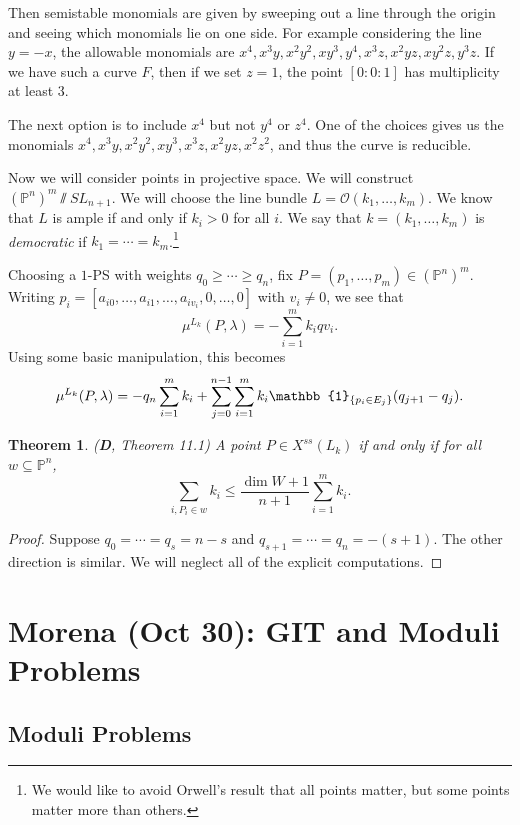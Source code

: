 \documentclass[leqno, openany]{memoir}
\newtheorem{thm}{Theorem}[section]
\theoremstyle{definition}
\theoremstyle{remark}
\theoremstyle{plain}
\theoremstyle{definition}
\theoremstyle{remark}
\renewcommand{\P}{\mathbb{P}}
\newcommand{\mc}[1]{\mathcal{#1}}
\begin{document}
Then semistable monomials are given by sweeping out a line through the origin
and seeing which monomials lie on one side. For example considering the line $y
= -x$, the allowable monomials are $x^4, x^3 y, x^2 y^2, xy^3, y^4, x^3z,
x^2yz, xy^2z,y^3z$. If we have such a curve $F$, then if we set $z=1$, the
point $[0:0:1]$ has multiplicity at least $3$.

The next option is to include $x^4$ but not $y^4$ or $z^4$. One of the choices
gives us the monomials $x^4, x^3 y, x^2 y^2, xy^3, x^3 z, x^2yz, x^2z^2$, and
thus the curve is reducible.

Now we will consider points in projective space. We will construct $(\P^n)^m
\sslash SL_{n+1}$. We will choose the line bundle $L = \mc{O}(k_1, \ldots,
k_m)$. We know that $L$ is ample if and only if $k_i > 0$ for all $i$. We say
that $k = (k_1, \ldots, k_m)$ is \textit{democratic} if $k_1 = \cdots =
k_m$.\footnote{We would like to avoid Orwell's result that all points matter,
but some points matter more than others.}

Choosing a $1$-PS with weights $q_0 \geq \cdots \geq q_n$, fix $P = (p_1,
\ldots, p_m) \in (\P^n)^m$. Writing $p_i = [a_{i0}, \ldots, a_{i1}, \ldots,
a_{iv_i}, 0, \ldots, 0]$ with $v_i \neq 0$, we see that \[ \mu^{L_k}(P,
\lambda) = - \sum_{i=1}^m k_i qv_i. \] Using some basic manipulation, this
becomes \[ \mu^{L_k}(P, \lambda) = -q_n \sum_{i=1}^m k_i + \sum_{j=0}^{n-1}
\sum_{i=1}^m k_i \mathbb{1}_{\qty{p_i \in E_j}} ( q_{j+1} - q_j ). \]

\begin{thm}(\textbf{D}, Theorem 11.1) A point $P \in X^{ss}(L_k)$ if and only
    if for all $w \subseteq \P^n$, \[ \sum_{i, P_i \in w} k_i \leq \frac{\dim W
    + 1}{n+1} \sum_{i=1}^m k_i. \] \end{thm}

\begin{proof} Suppose $q_0 = \cdots = q_s = n-s$ and $q_{s+1} = \cdots = q_n =
-(s+1)$. The other direction is similar. We will neglect all of the explicit
computations.  \end{proof}

\chapter{Morena (Oct 30): GIT and Moduli Problems}%
\label{sec:morena_oct_30_git_and_moduli_problems}

\section{Moduli Problems}%
\end{document}
